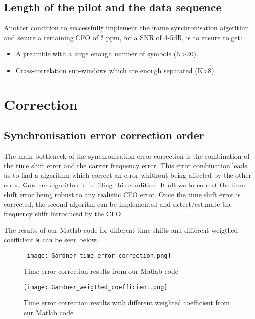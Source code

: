 \subsection{Length of the pilot and the data sequence}

Another condition to successfully implement the frame synchronisation algorithm and secure a remaining 
CFO of 2 ppm, for a SNR of 4-5dB, is to ensure to get:
\begin{itemize}
    \item A preamble with a large enough number of symbols (N>20).
    \item Cross-correlation sub-windows which are enough separated (K>8).  
\end{itemize}

\section{Correction}

\subsection{Synchronisation error correction order}

The main bottleneck of the synchronisation error correction is the combination of the time shift error and
 the carrier frequency error.
This error combination leads us to find a algorithm which correct an error whithout being affected by the other error.
Gardner algorithm is fulfilling this condition.  It allows to correct the time shift error being robust to any realistic CFO error.
Once the time shift error is corrected, the second algoritm can be implemented and detect/estimate the frequency shift introduced by the CFO.\newline

The results of our Matlab code for different time shifts and different weigthed coefficient \textbf{k} can be seen below.

\begin{figure}[H]
    \centering
    \texttt{[image: Gardner\_time\_error\_correction.png]}
    \caption{Time error correction results from our Matlab code}
    \label{fig:Gardner_time_error_correction}
\end{figure}

\begin{figure}[H]
    \centering
    \texttt{[image: Gardner\_weigthed\_coefficient.png]}
    \caption{Time error correction results with different weighted coefficient from our Matlab code}
    \label{fig:Gardner_weigthed_coefficient}
\end{figure}

